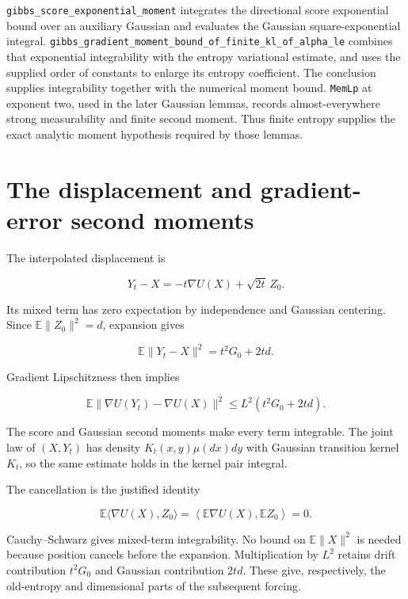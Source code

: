 \documentclass[11pt,a4paper]{article}
\begin{document}
\begin{leanbox}
\texttt{gibbs\_\allowbreak{}score\_\allowbreak{}exponential\_\allowbreak{}moment} integrates the directional score exponential bound over an auxiliary Gaussian and evaluates the Gaussian square-exponential integral. \texttt{gibbs\_\allowbreak{}gradient\_\allowbreak{}moment\_\allowbreak{}bound\_\allowbreak{}of\_\allowbreak{}finite\_\allowbreak{}kl\_\allowbreak{}of\_\allowbreak{}alpha\_\allowbreak{}le} combines that exponential integrability with the entropy variational estimate, and uses the supplied order of constants to enlarge its entropy coefficient. The conclusion supplies integrability together with the numerical moment bound. \texttt{Mem\allowbreak{}Lp} at exponent two, used in the later Gaussian lemmas, records almost-everywhere strong measurability and finite second moment. Thus finite entropy supplies the exact analytic moment hypothesis required by those lemmas.
\end{leanbox}

\section{\texorpdfstring{The displacement and gradient-error second moments}{The displacement and gradient-error second moments}}


The interpolated displacement is

\[Y_t-X=-t\nabla U(X)+\sqrt{2t}\,Z_0.\]

Its mixed term has zero expectation by independence and Gaussian centering. Since \(\mathbb E\|Z_0\|^2=d\), expansion gives

\[\mathbb E\|Y_t-X\|^2=t^2G_0+2td.\]

Gradient Lipschitzness then implies

\[\mathbb E\|\nabla U(Y_t)-\nabla U(X)\|^2
\le L^2(t^2G_0+2td).\]

The score and Gaussian second moments make every term integrable. The joint law of \((X,Y_t)\) has density \(K_t(x,y)\mu(dx)dy\) with Gaussian transition kernel \(K_t\), so the same estimate holds in the kernel pair integral.



The cancellation is the justified identity

\[\mathbb E\langle\nabla U(X),Z_0\rangle
=\left\langle\mathbb E\nabla U(X),\mathbb EZ_0\right\rangle=0.\]

Cauchy–Schwarz gives mixed-term integrability. No bound on \(\mathbb E\|X\|^2\) is needed because position cancels before the expansion. Multiplication by \(L^2\) retains drift contribution \(t^2G_0\) and Gaussian contribution \(2td\). These give, respectively, the old-entropy and dimensional parts of the subsequent forcing.
\end{document}

